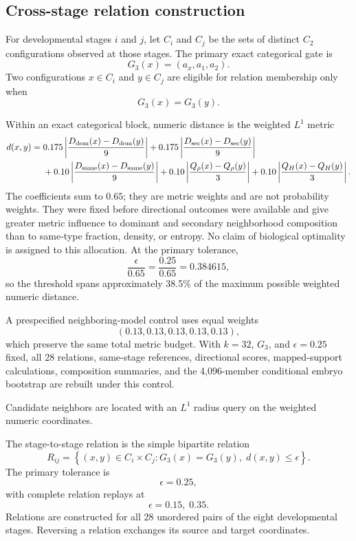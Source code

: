 \documentclass[11pt]{article}
\begin{document}
\subsection{Cross-stage relation construction}

For developmental stages \(i\) and \(j\), let \(C_i\) and \(C_j\) be the sets of distinct \(C_2\) configurations observed at those stages. The primary exact categorical gate is
\[
G_3(x)
=
(a_x,a_1,a_2).
\]
Two configurations \(x\in C_i\) and \(y\in C_j\) are eligible for relation membership only when
\[
G_3(x)=G_3(y).
\]

Within an exact categorical block, numeric distance is the weighted \(L^1\) metric
\begin{align}
d(x,y)={}&
0.175\left|\frac{D_{\rm dom}(x)-D_{\rm dom}(y)}9\right|
+
0.175\left|\frac{D_{\rm sec}(x)-D_{\rm sec}(y)}9\right|
\nonumber\\
&+
0.10\left|\frac{D_{\rm same}(x)-D_{\rm same}(y)}9\right|
+
0.10\left|\frac{Q_\rho(x)-Q_\rho(y)}3\right|
+
0.10\left|\frac{Q_H(x)-Q_H(y)}3\right|.
\label{eq:metric}
\end{align}
The coefficients sum to \(0.65\); they are metric weights and are not probability weights. They were fixed before directional outcomes were available and give greater metric influence to dominant and secondary neighborhood composition than to same-type fraction, density, or entropy. No claim of biological optimality is assigned to this allocation. At the primary tolerance,
\[
\frac{\epsilon}{0.65}
=
\frac{0.25}{0.65}
=
0.384615,
\]
so the threshold spans approximately 38.5\% of the maximum possible weighted numeric distance.

A prespecified neighboring-model control uses equal weights
\[
(0.13,0.13,0.13,0.13,0.13),
\]
which preserve the same total metric budget. With \(k=32\), \(G_3\), and \(\epsilon=0.25\) fixed, all 28 relations, same-stage references, directional scores, mapped-support calculations, composition summaries, and the 4,096-member conditional embryo bootstrap are rebuilt under this control.

Candidate neighbors are located with an \(L^1\) radius query on the weighted numeric coordinates.

The stage-to-stage relation is the simple bipartite relation
\begin{equation}
R_{ij}
=
\left\{
(x,y)\in C_i\times C_j:
G_3(x)=G_3(y),\;
d(x,y)\le\epsilon
\right\}.
\label{eq:relation}
\end{equation}
The primary tolerance is
\[
\epsilon=0.25,
\]
with complete relation replays at
\[
\epsilon=0.15,\;0.35.
\]
Relations are constructed for all 28 unordered pairs of the eight developmental stages. Reversing a relation exchanges its source and target coordinates.
\end{document}
